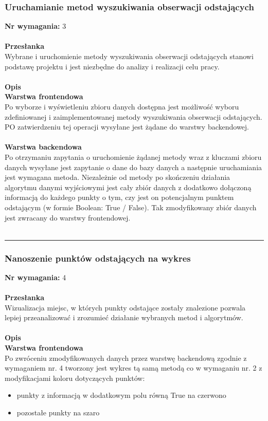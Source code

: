 \documentclass[eng,printmode]{mgr}
\begin{document}
\subsubsection{Uruchamianie metod wyszukiwania obserwacji odstających}
\textbf{Nr wymagania:} 3
\\\\
\textbf{Przesłanka}\\
Wybrane i uruchomienie metody wyszukiwania obserwacji odstających stanowi podstawę projektu i jest niezbędne do analizy i realizacji celu pracy.
\\\\
\textbf{Opis}\\
\textbf{Warstwa frontendowa}\\
Po wyborze i wyświetleniu zbioru danych dostępna jest możliwość wyboru zdefiniowanej i zaimplementowanej metody wyszukiwania obserwacji odstających. PO zatwierdzeniu tej operacji wysyłane jest żądane do warstwy backendowej.
\\\\
\textbf{Warstwa backendowa}\\
Po otrzymaniu zapytania o uruchomienie żądanej metody wraz z kluczami zbioru danych wysyłane jest zapytanie o dane do bazy danych a następnie uruchamiania jest wymagana metoda. Niezależnie od metody po skończeniu działania algorytmu danymi wyjściowymi jest cały zbiór danych z dodatkowo dołączoną informacją do każdego punkty o tym, czy jest on potencjalnym punktem odstającym (w formie Boolean: True / False). Tak zmodyfikowany zbiór danych jest zwracany do warstwy frontendowej.
\\\\\noindent\rule{\textwidth}{2pt}
\subsubsection{Nanoszenie punktów odstających na wykres}
\textbf{Nr wymagania:} 4
\\\\
\textbf{Przesłanka}\\
Wizualizacja miejsc, w których punkty odstające zostały znalezione pozwala lepiej przeanalizować i zrozumieć działanie wybranych metod i algorytmów.
\\\\
\textbf{Opis}\\
\textbf{Warstwa frontendowa}\\
Po zwróceniu zmodyfikowanych danych przez warstwę backendową zgodnie z wymaganiem nr. 4 tworzony jest wykres tą samą metodą co w wymaganiu nr. 2 z modyfikacjami koloru dotyczących punktów:
\begin{itemize}
  \item punkty z informacją w dodatkowym polu równą True na czerwono
  \item pozostałe punkty na szaro
\end{itemize}
\end{document}
